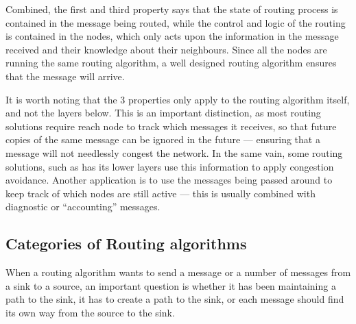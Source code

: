 Combined, the first and third property says that the state of routing process is contained in the message being routed, while the control and logic of the routing is contained in the nodes, which only acts upon the information in the message received and their knowledge about their neighbours. Since all the nodes are running the same routing algorithm, a well designed routing algorithm ensures that the message will arrive.

\label{record-recived}
It is worth noting that the 3 properties only apply to the routing algorithm itself, and not the layers below. This is an important distinction, as most routing solutions require reach node to track which messages it receives, so that future copies of the same message can be ignored in the future --- ensuring that a message will not needlessly congest the network. In the same vain, some routing solutions, such as \cite{speed} has its lower layers use this information to apply congestion avoidance. Another application is to use the messages being passed around to keep track of which nodes are still active --- this is usually combined with diagnostic or ``accounting'' messages. 

\subsection{Categories of Routing algorithms}
When a routing algorithm wants to send a message or a number of messages from a sink to a source, an important question is whether it has been maintaining a path to the sink, it has to create a path to the sink, or each message should find its own way from the source to the sink.

